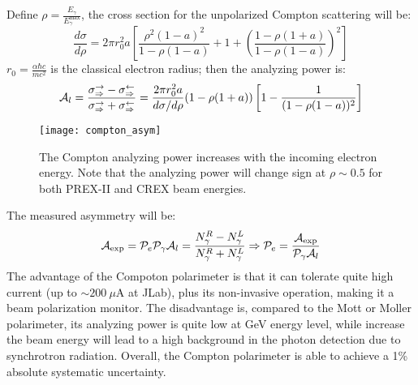 Define $\rho = \frac{E_\gamma}{E_\gamma^{\text{max}}}$, the cross section for the unpolarized
Compton scattering will be:
\begin{equation}
    \frac{d\sigma}{d\rho} = 2\pi r_0^2 a 
    \left[ \frac{\rho^2 (1-a)^2}{1 - \rho(1-a)} + 1 + \left( \frac{1 - \rho(1+a)}{1- \rho(1-a)}\right)^2\right]
\end{equation}
$r_0 = \frac{\alpha \hbar c}{mc^2}$ is the classical electron radius; then the
analyzing power is:
\begin{equation}
    \mathcal{A}_l = \frac{\sigma^\rightarrow_\Rightarrow - \sigma^\leftarrow_\Rightarrow}
    {\sigma^\rightarrow_\Rightarrow + \sigma^\leftarrow_\Rightarrow}
    = \frac{2\pi r_0^2 a}{d\sigma/d\rho}(1 - \rho(1+a))\left[ 1 - \frac{1}{(1 - \rho(1-a))^2}\right]
\end{equation}
\begin{figure}
    \centering
    \texttt{[image: compton\_asym]}
    \caption[Compton analyzing power]
    {The Compton analyzing power increases with the incoming electron energy. 
    Note that the analyzing power will change sign at $\rho \sim 0.5$ for both PREX-II
    and CREX beam energies.}
\end{figure}

The measured asymmetry will be:
\begin{equation}
    \mathcal{A}_{\text{exp}} = \mathcal{P}_{e}\mathcal{P}_{\gamma}\mathcal{A}_{l} = \frac{N_{\gamma}^R - N_{\gamma}^L}{N_{\gamma}^R + N_{\gamma}^L}
    \Rightarrow
    \mathcal{P}_e = \frac{\mathcal{A}_{\text{exp}}}{\mathcal{P}_{\gamma}\mathcal{A}_{l}}
\end{equation}
The advantage of the Compoton polarimeter is that it can tolerate quite high current
(up to $\sim 200 \ \mu$A at JLab), plus its non-invasive operation, making it a beam 
polarization monitor. The disadvantage is, compared to the Mott or Moller polarimeter,
its analyzing power is quite low at GeV energy level, while increase the beam
energy will lead to a high background in the photon detection due to synchrotron 
radiation. Overall, the Compton polarimeter is able to achieve a 1\% absolute systematic
uncertainty.

